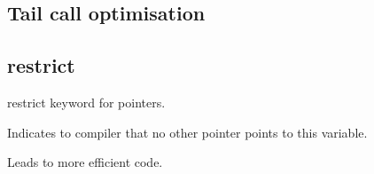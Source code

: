 
\subsection{Tail call optimisation}

\subsection{restrict}

restrict keyword for pointers.

Indicates to compiler that no other pointer points to this variable.

Leads to more efficient code.

